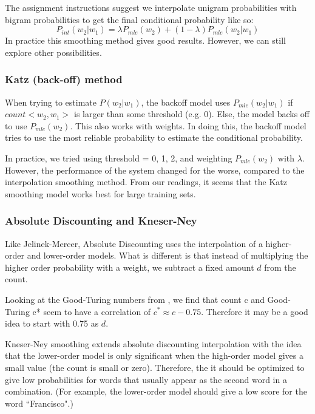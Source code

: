 \documentclass[10pt,twocolumn]{article}
\begin{document}
The assignment instructions suggest we interpolate unigram probabilities with bigram probabilities to get the final conditional probability like so:
\begin{equation*}
P_{int}(w_2|w_1) = \lambda P_{mle}(w_2) + (1-\lambda)P_{mle}(w_2|w_1)
\end{equation*}
In practice this smoothing method gives good results. However, we can still explore other possibilities.
\subsubsection{Katz (back-off) method}
When trying to estimate $P(w_2|w_1)$, the backoff model\cite{katz1987estimation} uses $P_{mle}(w_2|w_1)$ if $count<w_2,w_1>$ is larger than some threshold (e.g. 0). Else, the model backs off to use $P_{mle}(w_2)$. This also works with weights. In doing this, the backoff model tries to use the most reliable probability to estimate the conditional probability.

In practice, we tried using threshold = 0, 1, 2, and weighting $P_{mle}(w_2)$ with $\lambda$. However, the performance of the system changed for the worse, compared to the interpolation smoothing method. From our readings, it seems that the Katz smoothing model works best for large training sets.
\subsubsection{Absolute Discounting and Kneser-Ney}
Like Jelinek-Mercer, Absolute Discounting uses the interpolation of a higher-order and lower-order models. What is different is that instead of multiplying the higher order probability with a weight, we subtract a fixed amount $d$ from the count. 

Looking at the Good-Turing numbers from \cite{church1991comparison}, we find that count c and Good-Turing c* seem to have a correlation of $c^*\approx c-0.75$. Therefore it may be a good idea to start with 0.75 as $d$.

Kneser-Ney smoothing extends absolute discounting interpolation with the idea that the lower-order model is only significant when the high-order model gives a small value (the count is small or zero). Therefore, the it should be optimized to give low probabilities for words that usually appear as the second word in a combination. (For example, the lower-order model should give a low score for the word ``Francisco".)
\end{document}
